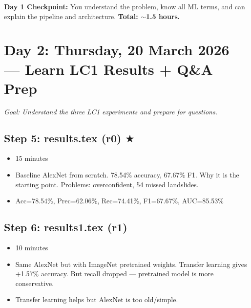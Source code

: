 \documentclass[12pt,a4paper]{article}
\begin{document}
\vspace{0.3cm}
\noindent\textbf{Day 1 Checkpoint:} You understand the problem, know all ML terms, and can explain the pipeline and architecture. \textbf{Total: $\sim$1.5 hours.}

\section{Day 2: Thursday, 20 March 2026 --- Learn LC1 Results + Q\&A Prep}

\noindent\textit{Goal: Understand the three LC1 experiments and prepare for questions.}

\begin{center}
\end{center}

\subsection*{Step 5: results.tex (r0) $\bigstar$}
\begin{itemize}[leftmargin=1.5cm]
    \item[\textbf{Time:}] 15 minutes
    \item[\textbf{What you learn:}] Baseline AlexNet from scratch. 78.54\% accuracy, 67.67\% F1. Why it is the starting point. Problems: overconfident, 54 missed landslides.
    \item[\textbf{Key numbers:}] Acc=78.54\%, Prec=62.06\%, Rec=74.41\%, F1=67.67\%, AUC=85.53\%
\end{itemize}

\subsection*{Step 6: results1.tex (r1)}
\begin{itemize}[leftmargin=1.5cm]
    \item[\textbf{Time:}] 10 minutes
    \item[\textbf{What you learn:}] Same AlexNet but with ImageNet pretrained weights. Transfer learning gives +1.57\% accuracy. But recall dropped --- pretrained model is more conservative.
    \item[\textbf{Key takeaway:}] Transfer learning helps but AlexNet is too old/simple.
\end{itemize}
\end{document}
